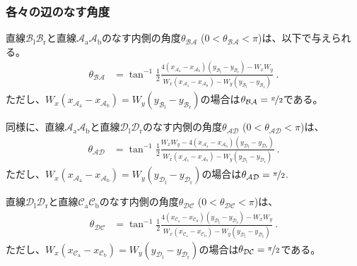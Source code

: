 \clearpage
\subsubsection{各々の辺のなす角度}
直線$\mathcal B_\mathrm l\mathcal B_\mathrm r$と直線$\mathcal A_\mathrm a\mathcal A_\mathrm b$のなす内側の角度$\theta_{\mathcal{BA}}$ ($0 < \theta_{\mathcal{BA}} < \pi$)は、以下で与えられる。
\begin{align*}
  \theta_{\mathcal{BA}}
  &= \tan^{-1}
     \frac12
     \frac{4\left(x_{\mathcal A_\mathrm a}-x_{\mathcal A_\mathrm b}\right)
            \left(y_{\mathcal B_\mathrm l}-y_{\mathcal B_\mathrm r}\right)
           -W_xW_y}
          {W_x\left(x_{\mathcal A_\mathrm a}-x_{\mathcal A_\mathrm b}\right)
           -W_y\left(y_{\mathcal B_\mathrm l}-y_{\mathcal B_\mathrm r}\right)}\ .
\end{align*}
ただし、$W_x\left(x_{\mathcal A_\mathrm a}-x_{\mathcal A_\mathrm b}\right) = W_y\left(y_{\mathcal B_\mathrm l}-y_{\mathcal B_\mathrm r}\right)$の場合は$\theta_{\mathcal{BA}} = \nicefrac\pi2$である。

同様に、直線$\mathcal A_\mathrm a\mathcal A_\mathrm b$と直線$\mathcal D_\mathrm l\mathcal D_\mathrm r$のなす内側の角度$\theta_{\mathcal{AD}}$ ($0 < \theta_{\mathcal{AD}} < \pi$)は、
\begin{align*}
  \theta_{\mathcal{AD}}
  &= \tan^{-1}
     \frac12
     \frac{W_xW_y
           -4\left(x_{\mathcal A_\mathrm a}-x_{\mathcal A_\mathrm b}\right)
             \left(y_{\mathcal D_\mathrm l}-y_{\mathcal D_\mathrm r}\right)}
          {W_x\left(x_{\mathcal A_\mathrm a}-x_{\mathcal A_\mathrm b}\right)
           -W_y\left(y_{\mathcal D_\mathrm l}-y_{\mathcal D_\mathrm r}\right)}\ .
\end{align*}
ただし、$W_x\left(x_{\mathcal A_\mathrm a}-x_{\mathcal A_\mathrm b}\right) = W_y\left(y_{\mathcal D_\mathrm l}-y_{\mathcal D_\mathrm r}\right)$の場合は$\theta_{\mathcal{AD}} = \nicefrac\pi2$.

直線$\mathcal D_\mathrm l\mathcal D_\mathrm r$と直線$\mathcal C_\mathrm a\mathcal C_\mathrm b$のなす内側の角度$\theta_{\mathcal{DC}}$ ($0 < \theta_{\mathcal{DC}} < \pi$)は、
\begin{align*}
  \theta_{\mathcal{DC}}
  &= \tan^{-1}
     \frac12
     \frac{4\left(x_{\mathcal C_\mathrm a}-x_{\mathcal C_\mathrm b}\right)
            \left(y_{\mathcal D_\mathrm l}-y_{\mathcal D_\mathrm r}\right)
           -W_xW_y}
          {W_x\left(x_{\mathcal C_\mathrm a}-x_{\mathcal C_\mathrm b}\right)
           -W_y\left(y_{\mathcal D_\mathrm l}-y_{\mathcal D_\mathrm r}\right)}\ .
\end{align*}
ただし、$W_x\left(x_{\mathcal C_\mathrm a}-x_{\mathcal C_\mathrm b}\right) = W_y\left(y_{\mathcal D_\mathrm l}-y_{\mathcal D_\mathrm r}\right)$の場合は$\theta_{\mathcal{DC}} = \nicefrac\pi2$である。


